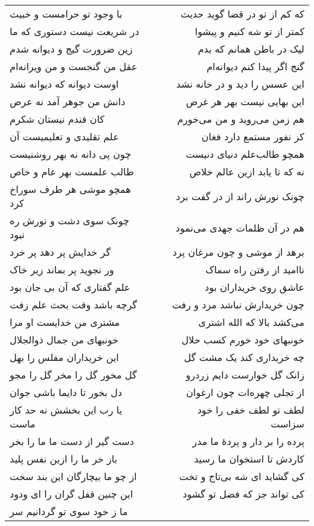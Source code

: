 \begin{center}
\begin{longtable}{l p{0.5cm} r}
با وجود تو حرامست و خبیث
&&
که کم از تو در قضا گوید حدیث
\\
در شریعت نیست دستوری که ما
&&
کمتر از تو شه کنیم و پیشوا
\\
زین ضرورت گیج و دیوانه شدم
&&
لیک در باطن همانم که بدم
\\
عقل من گنجست و من ویرانه‌ام
&&
گنج اگر پیدا کنم دیوانه‌ام
\\
اوست دیوانه که دیوانه نشد
&&
این عسس را دید و در خانه نشد
\\
دانش من جوهر آمد نه عرض
&&
این بهایی نیست بهر هر غرض
\\
کان قندم نیستان شکرم
&&
هم زمن می‌روید و من می‌خورم
\\
علم تقلیدی و تعلیمیست آن
&&
کز نفور مستمع دارد فغان
\\
چون پی دانه نه بهر روشنیست
&&
همچو طالب‌علم دنیای دنیست
\\
طالب علمست بهر عام و خاص
&&
نه که تا یابد ازین عالم خلاص
\\
همچو موشی هر طرف سوراخ کرد
&&
چونک نورش راند از در گفت برد
\\
چونک سوی دشت و نورش ره نبود
&&
هم در آن ظلمات جهدی می‌نمود
\\
گر خدایش پر دهد پر خرد
&&
برهد از موشی و چون مرغان پرد
\\
ور نجوید پر بماند زیر خاک
&&
ناامید از رفتن راه سماک
\\
علم گفتاری که آن بی جان بود
&&
عاشق روی خریداران بود
\\
گرچه باشد وقت بحث علم زفت
&&
چون خریدارش نباشد مرد و رفت
\\
مشتری من خدایست او مرا
&&
می‌کشد بالا که الله اشتری
\\
خونبهای من جمال ذوالجلال
&&
خونبهای خود خورم کسب حلال
\\
این خریداران مفلس را بهل
&&
چه خریداری کند یک مشت گل
\\
گل مخور گل را مخر گل را مجو
&&
زانک گل خوارست دایم زردرو
\\
دل بخور تا دایما باشی جوان
&&
از تجلی چهره‌ات چون ارغوان
\\
یا رب این بخشش نه حد کار ماست
&&
لطف تو لطف خفی را خود سزاست
\\
دست گیر از دست ما ما را بخر
&&
پرده را بر دار و پردهٔ ما مدر
\\
باز خر ما را ازین نفس پلید
&&
کاردش تا استخوان ما رسید
\\
از چو ما بیچارگان این بند سخت
&&
کی گشاید ای شه بی‌تاج و تخت
\\
این چنین قفل گران را ای ودود
&&
کی تواند جز که فضل تو گشود
\\
ما ز خود سوی تو گردانیم سر

\end{longtable}
\end{center}
